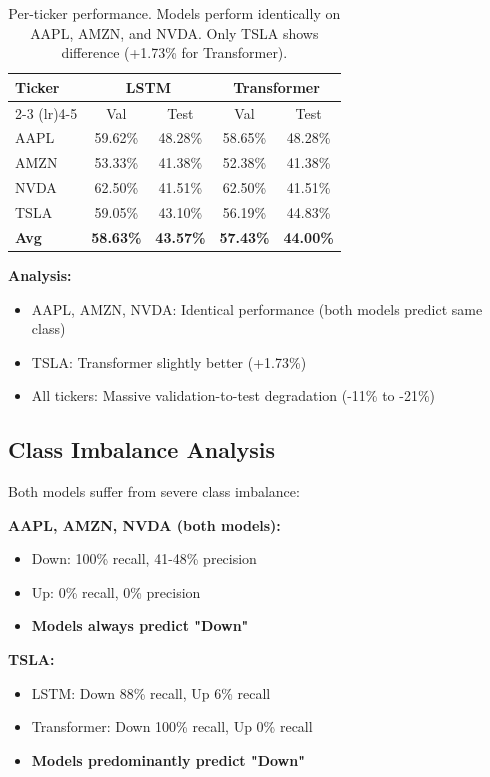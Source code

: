\documentclass[10pt,twocolumn]{article}
\begin{document}
\begin{table}[h]
\centering
\small
\begin{tabular}{lcccc}
\toprule
Ticker & \multicolumn{2}{c}{LSTM} & \multicolumn{2}{c}{Transformer} \\
\cmidrule(lr){2-3} \cmidrule(lr){4-5}
 & Val & Test & Val & Test \\
\midrule
AAPL & 59.62\% & 48.28\% & 58.65\% & 48.28\% \\
AMZN & 53.33\% & 41.38\% & 52.38\% & 41.38\% \\
NVDA & 62.50\% & 41.51\% & 62.50\% & 41.51\% \\
TSLA & 59.05\% & 43.10\% & 56.19\% & 44.83\% \\
\midrule
\textbf{Avg} & \textbf{58.63\%} & \textbf{43.57\%} & \textbf{57.43\%} & \textbf{44.00\%} \\
\bottomrule
\end{tabular}
\caption{Per-ticker performance. Models perform identically on AAPL, AMZN, and NVDA. Only TSLA shows difference (+1.73\% for Transformer).}
\end{table}

\textbf{Analysis:} 
\begin{itemize}
\item AAPL, AMZN, NVDA: Identical performance (both models predict same class)
\item TSLA: Transformer slightly better (+1.73\%)
\item All tickers: Massive validation-to-test degradation (-11\% to -21\%)
\end{itemize}

\subsection{Class Imbalance Analysis}

Both models suffer from severe class imbalance:

\textbf{AAPL, AMZN, NVDA (both models):}
\begin{itemize}
\item Down: 100\% recall, 41-48\% precision
\item Up: 0\% recall, 0\% precision
\item \textbf{Models always predict "Down"}
\end{itemize}

\textbf{TSLA:}
\begin{itemize}
\item LSTM: Down 88\% recall, Up 6\% recall
\item Transformer: Down 100\% recall, Up 0\% recall
\item \textbf{Models predominantly predict "Down"}
\end{itemize}
\end{document}

